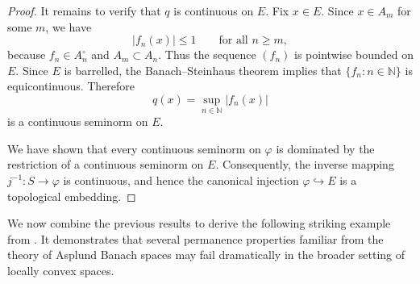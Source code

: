 \documentclass[12pt]{amsart}
\theoremstyle{plain}
\theoremstyle{definition}
\theoremstyle{remark}
\begin{document}
\begin{proof}
It remains to verify that $q$ is continuous on $E$. Fix $x\in E$. Since
$x\in A_m$ for some $m$, we have
\[
|f_n(x)|\le 1
\qquad \text{for all }n\ge m,
\]
because $f_n\in A_n^\circ$ and $A_m\subset A_n$. Thus the sequence
$(f_n)$ is pointwise bounded on $E$. Since $E$ is barrelled, the Banach--Steinhaus theorem implies that
$\{f_n:n\in\mathbb N\}$ is equicontinuous. Therefore
\[
q(x)=\sup_{n\in\mathbb N}|f_n(x)|
\]
is a continuous seminorm on $E$.

We have shown that every continuous seminorm on $\varphi$ is dominated by the restriction of a continuous seminorm on $E$. Consequently, the inverse mapping
$j^{-1}:S\to\varphi$
is continuous, and hence the canonical injection $\varphi\hookrightarrow E$
is a topological embedding.
\end{proof}



We now combine the previous results to derive the following striking example from \cite{Kakol-Leiderman}. It demonstrates that several permanence properties familiar from the theory of Asplund Banach spaces may fail dramatically in the broader setting of locally convex spaces.
\end{document}
